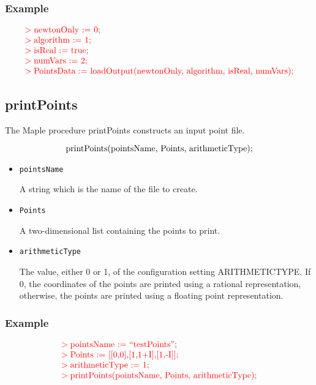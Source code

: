 \documentclass[11pt]{report}
\begin{document}
\subsubsection{Example}

\[
\begin{color}{red}\begin{array}{l}
> \hbox{newtonOnly := 0;}\\
> \hbox{algorithm := 1;}\\
> \hbox{isReal := true;}\\
> \hbox{numVars := 2;}\\
> \hbox{PointsData := loadOutput(newtonOnly, algorithm, isReal, numVars);}
\end{array}\end{color}
\]

\subsection{printPoints}\label{Sec:PointsM}

The Maple procedure printPoints constructs an input point file.

\[
\hbox{printPoints(pointsName, Points, arithmeticType);}
\]

\begin{itemize}

\item {\tt pointsName}

A string which is the name of the file to create.

\item {\tt Points}

A two-dimensional list containing the points to print.

\item {\tt arithmeticType}

The value, either 0 or 1, of the configuration setting ARITHMETICTYPE.
If 0, the coordinates of the points are printed using a rational representation,
otherwise, the points are printed using a floating point representation.

\end{itemize}

\subsubsection{Example}

\[
\begin{color}{red}\begin{array}{l}
> \hbox{pointsName := ``testPoints'';} \\
> \hbox{Points := [[0,0],[1,1+I],[1,-I]];} \\
> \hbox{arithmeticType := 1;} \\
> \hbox{printPoints(pointsName, Points, arithmeticType);}
\end{array}\end{color}
\]
\end{document}
